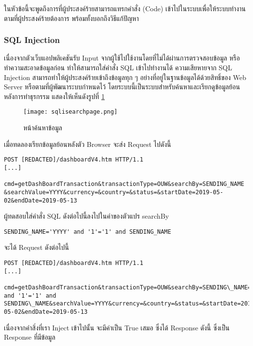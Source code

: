ในหัวข้อนี้จะพูดถึงการที่ผู้ประสงค์ร้ายสามารถแทรกคำสั่ง (Code) เข้าไปในระบบเพื่อให้ระบบทำงานตามที่ผู้ประสงค์ร้ายต้องการ พร้อมทั้งบอกถึงวิธีแก้ปัญหา

\subsubsection{SQL Injection}

เนื่องจากตัวเว็บแอปพลิเคชันรับ Input จากผู้ใช้ไปใช้งานโดยที่ไม่ได้ผ่านการตรวจสอบข้อมูล หรือทำความสะอาดข้อมูลก่อน ทำให้สามารถใส่คำสั่ง SQL เข้าไปทำงานได้ ความเสียหายจาก SQL Injection สามารถทำให้ผู้ประสงค์ร้ายเข้าถึงข้อมูลทุก ๆ อย่างที่อยู่ในฐานข้อมูลได้ด้วยสิทธิ์ของ Web Server หรือตามที่ผู้พัฒนาระบบกำหนดไว้ โดยระบบนี้เป็นระบบสำหรับค้นหาและเรียกดูข้อมูลย้อนหลังการทำธุรกรรม แสดงให้เห็นดังรูปที่ \ref{Fig:sqlisearchpage.png}

\begin{figure}[h]
	\centering
	\texttt{[image: sqlisearchpage.png]}
	\caption{หน้าค้นหาข้อมูล}
	\label{Fig:sqlisearchpage.png}
\end{figure}

เมื่อทดลองเรียกข้อมูลย้อนหลังตัว Browser จะส่ง Request ไปดังนี้

\begin{lstlisting}[numbers=none] 
POST [REDACTED]/dashboardV4.htm HTTP/1.1
[...]

cmd=getDashBoardTransaction&transactionType=OUW&searchBy=SENDING_NAME &searchValue=YYYY&currency=&country=&status=&startDate=2019-05-02&endDate=2019-05-13
\end{lstlisting}

ผู้ทดสอบใส่คำสั่ง SQL ดังต่อไปนี้ลงไปในค่าของตัวแปร searchBy

\begin{lstlisting}[numbers=none] 
SENDING_NAME='YYYY' and '1'='1' and SENDING_NAME
\end{lstlisting}

จะได้ Request ดังต่อไปนี้

\begin{lstlisting}[numbers=none] 
POST [REDACTED]/dashboardV4.htm HTTP/1.1
[...]

cmd=getDashBoardTransaction&transactionType=OUW&searchBy=SENDING\_NAME='YYYY' and '1'='1' and SENDING\_NAME&searchValue=YYYY&currency=&country=&status=&startDate=2019-05-02&endDate=2019-05-13
\end{lstlisting}

เนื่องจากคำสิ่งที่เรา Inject เข้าไปนั้น จะมีค่าเป็น True เสมอ ซึ่งได้ Response ดังนี้ ซึ่งเป็น Response ที่มีข้อมูล

